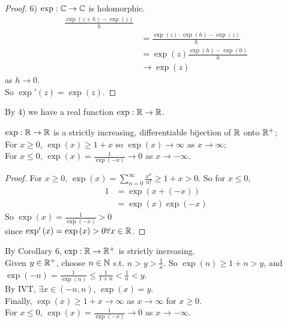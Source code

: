 \documentclass[a4paper]{article}
\begin{document}
\begin{thm}
\begin{proof}
6) $\exp: \mathbb{C}\to\mathbb{C}$ is holomorphic.\\
\begin{equation*}
\begin{aligned}
\frac{\exp\left(z+h\right)-\exp\left(z\right)}{h}\\
&= \frac{\exp\left(z\right)\cdot\exp\left(h\right)-\exp\left(z\right)}{h}\\
&=\exp\left(z\right)\frac{\exp\left(h\right)-\exp\left(0\right)}{h}\\
&\to \exp\left(z\right)
\end{aligned}
\end{equation*}
as $h\to 0$.\\
So $\exp'\left(z\right) = \exp\left(z\right)$.
\end{proof}
\end{thm}

By 4) we have a real function $\exp:\mathbb{R}\to\mathbb{R}$.\\

\begin{thm}
$\exp:\mathbb{R}\to\mathbb{R}$ is a strictly increasing, differentiable bijection of $\mathbb{R}$ onto $\mathbb{R}^+$;\\
For $x\geq 0$, $\exp\left(x\right)\geq 1+x$ so $\exp\left(x\right)\to\infty$ as $x\to\infty$;\\
For $x\leq 0$, $\exp\left(x\right)=\frac{1}{\exp\left(-x\right)}\to 0$ as $x\to -\infty$.\\
\begin{proof}
For $x\geq 0$, $\exp\left(x\right)=\sum_{n=0}^\infty \frac{x^n}{n!} \geq 1+x > 0$.
So for $x \leq 0$,
\begin{equation*}
\begin{aligned}
1&=\exp\left(x+\left(-x\right)\right)\\
&= \exp\left(x\right)\exp\left(-x\right)
\end{aligned}
\end{equation*}
So $\exp\left(x\right) = \frac{1}{\exp\left(-x\right)} > 0$\\
since $\exp'\left(x\right)=\exp\left(x\right)>0 \forall x\in\mathbb{R}$.
\end{proof}
\end{thm}

By Corollary 6, $\exp:\mathbb{R}\to\mathbb{R}^+$ is strictly increasing.\\
Given $y\in\mathbb{R}^+$, choose $n\in\mathbb{N}$ s.t. $n>y>\frac{1}{n}$. So $\exp\left(n\right)\geq 1+n > y$, and $\exp\left(-n\right)=\frac{1}{\exp\left(n\right)}\leq \frac{1}{1+n}<\frac{1}{n}<y$.\\
By IVT, $\exists x\in\left(-n,n\right)$, $\exp\left(x\right) = y$.\\
Finally, $\exp\left(x\right)\geq 1+x\to\infty$ as $x\to\infty$ for $x\geq 0$.\\
For $x\leq 0$, $\exp\left(x\right) = \frac{1}{\exp\left(-x\right)}\to 0$ as $x\to -\infty$.\\
\end{document}
